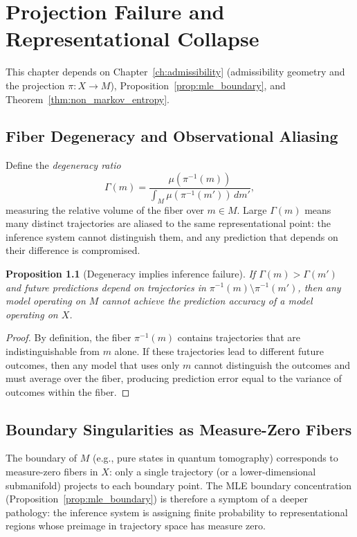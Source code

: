 \documentclass[11pt, openright, twoside]{book}
\theoremstyle{plain}
\newtheorem{proposition}[theorem]{Proposition}
\theoremstyle{definition}
\theoremstyle{remark}
\newcommand{\Traj}{X}
\newcommand{\Rep}{M}
\newcommand{\proj}{\pi}
\begin{document}
\chapter{Projection Failure and Representational Collapse}

\begin{depbox}
This chapter depends on Chapter~\ref{ch:admissibility} (admissibility geometry and the
projection $\proj:\Traj\to\Rep$), Proposition~\ref{prop:mle_boundary}, and
Theorem~\ref{thm:non_markov_entropy}.
\end{depbox}

\section{Fiber Degeneracy and Observational Aliasing}

Define the \emph{degeneracy ratio}
\begin{equation}
  \Gamma(m) = \frac{\mu(\proj^{-1}(m))}{\int_\Rep\mu(\proj^{-1}(m'))\,dm'},
\end{equation}
measuring the relative volume of the fiber over $m\in\Rep$. Large $\Gamma(m)$ means many
distinct trajectories are aliased to the same representational point: the inference system
cannot distinguish them, and any prediction that depends on their difference is compromised.

\begin{proposition}[Degeneracy implies inference failure]
If $\Gamma(m)>\Gamma(m')$ and future predictions depend on trajectories in
$\proj^{-1}(m)\setminus\proj^{-1}(m')$, then any model operating on $\Rep$ cannot achieve
the prediction accuracy of a model operating on $\Traj$.
\end{proposition}

\begin{proof}
By definition, the fiber $\proj^{-1}(m)$ contains trajectories that are indistinguishable
from $m$ alone. If these trajectories lead to different future outcomes, then any model
that uses only $m$ cannot distinguish the outcomes and must average over the fiber,
producing prediction error equal to the variance of outcomes within the fiber.
\end{proof}

\section{Boundary Singularities as Measure-Zero Fibers}

The boundary of $\Rep$ (e.g., pure states in quantum tomography) corresponds to
measure-zero fibers in $\Traj$: only a single trajectory (or a lower-dimensional
submanifold) projects to each boundary point. The MLE boundary concentration
(Proposition~\ref{prop:mle_boundary}) is therefore a symptom of a deeper pathology:
the inference system is assigning finite probability to representational regions
whose preimage in trajectory space has measure zero.
\end{document}
